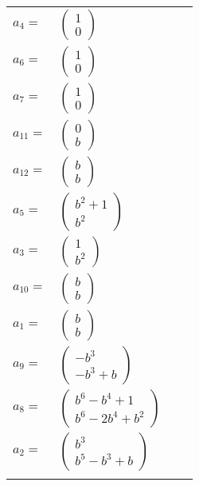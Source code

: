 \documentclass[1p]{elsarticle_modified}
\theoremstyle{definition}
\begin{document}
\begin{tabular}{m{7pt} m{180pt} m{7pt} m{180pt} }
\flushright $a_{4}=$&$\begin{pmatrix}1\\0\end{pmatrix}$ \\
\flushright $a_{6}=$&$\begin{pmatrix}1\\0\end{pmatrix}$ \\
\flushright $a_{7}=$&$\begin{pmatrix}1\\0\end{pmatrix}$ \\
\flushright $a_{11}=$&$\begin{pmatrix}0\\b\end{pmatrix}$ \\
\flushright $a_{12}=$&$\begin{pmatrix}b\\b\end{pmatrix}$ \\
\flushright $a_{5}=$&$\begin{pmatrix}b^2+1\\b^2\end{pmatrix}$ \\
\flushright $a_{3}=$&$\begin{pmatrix}1\\b^2\end{pmatrix}$ \\
\flushright $a_{10}=$&$\begin{pmatrix}b\\b\end{pmatrix}$ \\
\flushright $a_{1}=$&$\begin{pmatrix}b\\b\end{pmatrix}$ \\
\flushright $a_{9}=$&$\begin{pmatrix}- b^3\\- b^3+b\end{pmatrix}$ \\
\flushright $a_{8}=$&$\begin{pmatrix}b^6- b^4+1\\b^6-2 b^4+b^2\end{pmatrix}$ \\
\flushright $a_{2}=$&$\begin{pmatrix}b^3\\b^5- b^3+b\end{pmatrix}$\\&\end{tabular}
\end{document}
